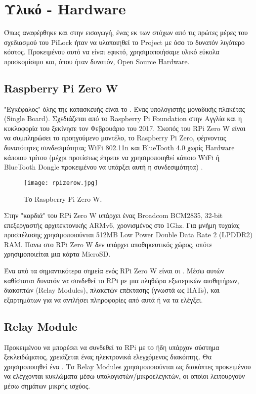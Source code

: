 \section{Υλικό - Hardware}
	\label{sec:hardw}
	Όπως αναφέρθηκε και στην εισαγωγή, ένας εκ των στόχων από τις πρώτες μέρες του σχεδιασμού του PiLock ήταν να υλοποιηθεί το Project με όσο το δυνατόν λιγότερο κόστος. Προκειμένου αυτό να είναι εφικτό, χρησιμοποιήσαμε υλικό εύκολα προσκομίσιμο και, όπου ήταν δυνατόν, Open Source Hardware.

	\subsection{Raspberry Pi Zero W}
		"Εγκέφαλος" όλης της κατασκευής είναι το . Ένας υπολογιστής μοναδικής πλακέτας (Single Board). Σχεδιάζεται από το Raspberry Pi Foundation στην Αγγλία και η κυκλοφορία του ξεκίνησε τον Φεβρουάριο του 2017. Σκοπός του RPi Zero W είναι να συμπληρώσει το προηγούμενο μοντέλο, το Raspberry Pi Zero, φέρνοντας δυνατότητες συνδεσιμότητας WiFi 802.11n και BlueTooth 4.0 χωρίς Hardware κάποιου τρίτου (μέχρι προτίστως έπρεπε να χρησιμοποιηθεί κάποιο WiFi ή BlueTooth Dongle προκειμένου να υπάρξει αυτή η συνδεσιμότητα) .

		\begin{figure}[h]
			\centering
				\texttt{[image: rpizerow.jpg]}
			\caption{Το Raspberry Pi Zero W.}
		\end{figure}

		Στην "καρδιά" του RPi Zero W υπάρχει ένας Broadcom BCM2835, 32-bit επεξεργαστής αρχιτεκτονικής ARMv6, χρονισμένος στο 1Ghz. Για μνήμη τυχαίας προσπέλασης χρησιμοποιούνται 512MB Low Power Double Data Rate 2 (LPDDR2) RAM. Πανω στο RPi Zero W δεν υπάρχει αποθηκευτικός χώρος, οπότε χρησιμοποιείται μια κάρτα MicroSD. 

		Ένα από τα σημαντικότερα σημεία ενός RPi Zero W είναι οι \textbf{}. Μέσω αυτών καθίσταται δυνατόν να συνδεθεί το RPi με μια πληθώρα εξωτερικών αισθητήρων, διακοπτών (Relay Modules), πλακετών επέκτασης (γνωστά ως HATs), και εξαρτημάτων για να αντλήσει πληροφορίες από αυτά ή να τα ελέγξει.

	\subsection{Relay Module}
		\label{sub:relay}
		Προκειμένου να μπορέσει να συνδεθεί το RPi με το ήδη υπάρχον σύστημα ξεκλειδώματος, χρειάζεται ένας ηλεκτρονικά ελεγχόμενος διακόπτης. Θα χρησιμοποιηθεί ένα \textbf{}. Τα Relay Modules χρησιμοποιούνται ως διακόπτες προκειμένου να ελέγχονται κυκλώματα μέσω υπολογιστών/μικροελεγκτών, οι οποίοι λειτουργούν μέσω σημάτων μικρής ισχύος.

